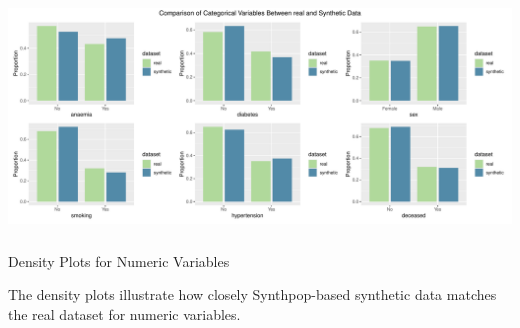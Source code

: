 \documentclass[
  letterpaper,
  DIV=11,
  numbers=noendperiod]{scrartcl}
\makeatletter
\let\oldsubparagraph\subparagraph
\renewcommand{\subparagraph}{
    \@ifstar
      \xxxSubParagraphStar
      \xxxSubParagraphNoStar
  }
\newcommand{\xxxSubParagraphStar}[1]{\oldsubparagraph*{#1}\mbox{}}
\newcommand{\xxxSubParagraphNoStar}[1]{\oldsubparagraph{#1}\mbox{}}
\makeatother
\begin{document}
\begin{center}
\includegraphics[width=1\linewidth,height=\textheight,keepaspectratio]{heart_failure_synthetic_data_project_files/figure-pdf/Bar plots for categorical variables (Synthpop-based synthetic data)-1.pdf}
\end{center}

\subparagraph{Density Plots for Numeric
Variables}\label{density-plots-for-numeric-variables-2}

The density plots illustrate how closely Synthpop-based synthetic data
matches the real dataset for numeric variables.
\end{document}
